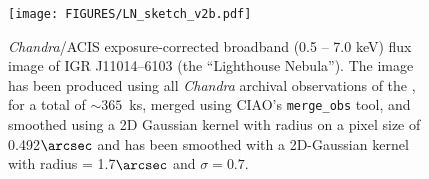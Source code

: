 


\begin{figure}[h]
  \centering
    \texttt{[image: FIGURES/LN\_sketch\_v2b.pdf]}
  \caption{\textit{Chandra}/ACIS exposure-corrected broadband (0.5 -- 7.0 keV) flux image of IGR J11014–6103 (the ``Lighthouse Nebula''). The image has been produced using all \textit{Chandra} archival observations of the \lneb, for a total of $\sim365$~ks, merged using CIAO's {\texttt{merge\_obs}} tool, and smoothed using a 2D Gaussian kernel with radius  on a pixel size of 0.492$\arcsec$ and has been smoothed with a 2D-Gaussian kernel with radius = 1.7$\arcsec$ and $\sigma = 0.7$\arcsec.}
  \label{figure:sketch}
\end{figure}